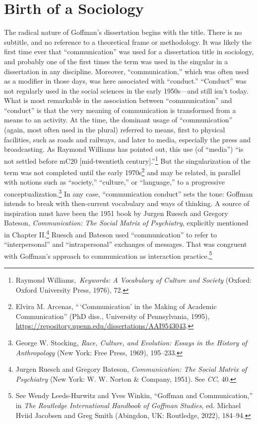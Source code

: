 \documentclass[twoside,symmetric,nobib,justified]{tufte-book}
\begin{document}
\hypertarget{birth-of-a-sociology}{%
\section{Birth of a Sociology}\label{birth-of-a-sociology}}

The radical nature of Goffman's dissertation begins with the title.
There is no subtitle, and no reference to a theoretical frame or
methodology. It was likely the first time ever that ``communication''
was used for a dissertation title in sociology, and probably one of the
first times the term was used in the singular in a dissertation in any
discipline. Moreover, ``communication,'' which was often used as a
modifier in those days, was here associated with ``conduct.''
``Conduct'' was not regularly used in the social sciences in the early
1950s---and still isn't today. What is most remarkable in the
association between ``communication'' and ``conduct'' is that the very
meaning of communication is transformed from a means to an activity. At
the time, the dominant usage of ``communication'' (again, most often
used in the plural) referred to means, first to physical facilities,
such as roads and railways, and later to media, especially the press and
broadcasting. As Raymond Williams has pointed out, this use (of
``media'') ``is not settled before mC20 {[}mid-twentieth
century{]}.''\footnote{Raymond Williams,~\emph{Keywords: A Vocabulary of
  Culture and Society} (Oxford: Oxford University Press, 1976), 72.} But
the singularization of the term was not completed until the early
1970s\footnote{Elvira M. Arcenas, ``\,`Communication' in the Making of
  Academic Communication'' (PhD diss., University of Pennsylvania,
  1995), \url{https://repository.upenn.edu/dissertations/AAI9543043}.}
and may be related, in parallel with notions such as ``society,''
``culture,'' or ``language,'' to a progressive
conceptualization.\footnote{George W. Stocking, \emph{Race, Culture, and
  Evolution: Essays in the History of Anthropology} (New York: Free
  Press, 1969), 195--233.} In any case, ``communication conduct'' sets
the tone: Goffman intends to break with then-current vocabulary and ways
of thinking. A source of inspiration must have been the 1951 book by
Jurgen Ruesch and Gregory Bateson, \emph{Communication: The Social
Matrix of Psychiatry}, explicitly mentioned in Chapter II.\footnote{Jurgen
  Ruesch and Gregory Bateson, \emph{Communication: The Social Matrix of
  Psychiatry} (New York: W. W. Norton \& Company, 1951). See \emph{CC},
  40.} Ruesch and Bateson used ``communication'' to refer to
``interpersonal'' and ``intrapersonal'' exchanges of messages. That was
congruent with Goffman's approach to communication as interaction
practice.\footnote{See Wendy Leeds-Hurwitz and Yves Winkin, ``Goffman
  and Communication,'' in \emph{The Routledge International Handbook of
  Goffman Studies}, ed. Michael Hviid Jacobsen and Greg Smith (Abingdon,
  UK: Routledge, 2022), 184--94.}
\end{document}
